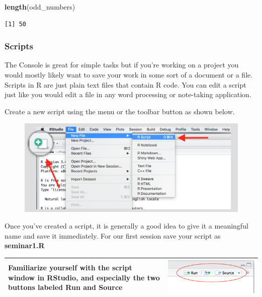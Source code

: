 \documentclass[]{article}
\newenvironment{Shaded}{\begin{snugshade}}{\end{snugshade}}
\newcommand{\KeywordTok}[1]{\textcolor[rgb]{0.13,0.29,0.53}{\textbf{#1}}}
\newcommand{\NormalTok}[1]{#1}
\theoremstyle{definition}
\theoremstyle{definition}
\theoremstyle{definition}
\theoremstyle{remark}
\begin{document}
\begin{Shaded}
\begin{Highlighting}[]
\KeywordTok{length}\NormalTok{(odd_numbers)}
\end{Highlighting}
\end{Shaded}

\begin{verbatim}
[1] 50
\end{verbatim}

\subsubsection{Scripts}\label{scripts}

The Console is great for simple tasks but if you're working on a project
you would mostly likely want to save your work in some sort of a
document or a file. Scripts in R are just plain text files that contain
R code. You can edit a script just like you would edit a file in any
word processing or note-taking application.

Create a new script using the menu or the toolbar button as shown below.

\begin{figure}
\centering
\includegraphics{./img/rstudio_newfile.png}
\caption{}
\end{figure}

Once you've created a script, it is generally a good idea to give it a
meaningful name and save it immediately. For our first session save your
script as \textbf{seminar1.R}

\begin{longtable}[]{@{}ll@{}}
\toprule
\begin{minipage}[t]{0.52\columnwidth}\raggedright\strut
Familiarize yourself with the script window in RStudio, and especially
the two buttons labeled \textbf{Run} and \textbf{Source}\strut
\end{minipage} & \begin{minipage}[t]{0.42\columnwidth}\raggedright\strut
\includegraphics{./img/rstudio_script.png}\strut
\end{minipage}\tabularnewline
\bottomrule
\end{longtable}
\end{document}
